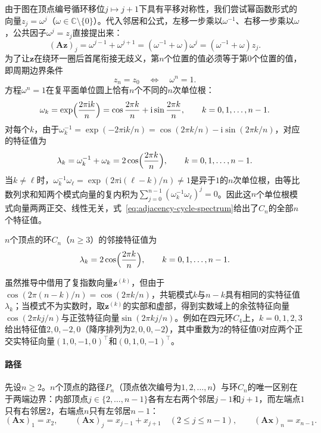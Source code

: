 由于图在顶点编号循环移位$j\mapsto j+1$下具有平移对称性，我们尝试幂函数形式的向量$z_j=\omega^j$（$\omega\in\mathbb C\setminus\{0\}$）。代入邻居和公式，左移一步乘以$\omega^{-1}$、右移一步乘以$\omega$，公共因子$\omega^j=z_j$直接提出来：
\[
(\bm A\bm z)_j=\omega^{j-1}+\omega^{j+1}=(\omega^{-1}+\omega)\omega^j=(\omega^{-1}+\omega)z_j.
\]
为了让$\bm z$在绕环一圈后首尾衔接无歧义，第$n$个位置的值必须等于第$0$个位置的值，即周期边界条件
\[
z_n=z_0\quad\Longleftrightarrow\quad \omega^n=1.
\]
方程$\omega^n=1$在复平面单位圆上恰有$n$个不同的$n$次单位根：
\[
\omega_k=\exp\Bigl(\frac{2\pi\mathrm ik}{n}\Bigr)=\cos\frac{2\pi k}{n}+\mathrm i\sin\frac{2\pi k}{n},
\qquad k=0,1,\ldots,n-1.
\]
对每个$k$，由于$\omega_k^{-1}=\exp(-2\pi\mathrm ik/n)=\cos(2\pi k/n)-\mathrm i\sin(2\pi k/n)$，对应的特征值为
\begin{equation}
\lambda_k=\omega_k^{-1}+\omega_k=2\cos\Bigl(\frac{2\pi k}{n}\Bigr),
\qquad k=0,1,\ldots,n-1.
\label{eq:adjacency-cycle-spectrum}
\end{equation}
当$k\neq\ell$时，$\omega_k^{-1}\omega_\ell=\exp(2\pi\mathrm i(\ell-k)/n)\neq 1$是异于$1$的$n$次单位根，由等比数列求和知两个模式向量的复内积为$\sum_{j=0}^{n-1}(\omega_k^{-1}\omega_\ell)^j=0$。因此这$n$个单位根模式向量两两正交、线性无关，式~\eqref{eq:adjacency-cycle-spectrum}给出了$C_n$的全部$n$个特征值。

\begin{theorem}[环的邻接谱]
\label{prop:adjacency-cycle-spectrum}
$n$个顶点的环$C_n$（$n\ge3$）的邻接特征值为
\[
\lambda_k=2\cos\Bigl(\frac{2\pi k}{n}\Bigr),
\qquad k=0,1,\ldots,n-1.
\]
\end{theorem}

虽然推导中借用了复指数向量$\bm z^{(k)}$，但由于$\cos(2\pi(n-k)/n)=\cos(2\pi k/n)$，共轭模式$k$与$n-k$具有相同的实特征值$\lambda_k$；当模式不为实数时，取$\bm z^{(k)}$的实部和虚部，得到实数域上的余弦特征向量$\cos(2\pi kj/n)$与正弦特征向量$\sin(2\pi kj/n)$。例如在四元环$C_4$上，$k=0,1,2,3$给出特征值$2,0,-2,0$（降序排列为$2,0,0,-2$），其中重数为$2$的特征值$0$对应两个正交实特征向量$(1,0,-1,0)^\top$和$(0,1,0,-1)^\top$。

\paragraph{路径}

先设$n\geq2$。$n$个顶点的路径$P_n$（顶点依次编号为$1,2,\ldots,n$）与环$C_n$的唯一区别在于两端边界：内部顶点$j\in\{2,\ldots,n-1\}$各有左右两个邻居$j-1$和$j+1$，而左端点$1$只有右邻居$2$，右端点$n$只有左邻居$n-1$：
\[
(\bm A\bm x)_1=x_2,\qquad
(\bm A\bm x)_j=x_{j-1}+x_{j+1}\quad(2\leq j\leq n-1),\qquad
(\bm A\bm x)_n=x_{n-1}.
\]

